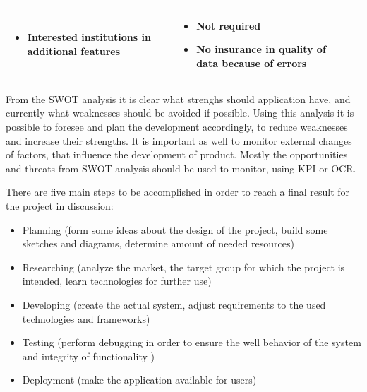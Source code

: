 \documentclass[12pt,a4paper,titlepage]{article}
\begin{document}
\begin{table}[h]
\begin{threeparttable}
\begin{tabular}{ | l | l | l | }
\begin{minipage}{3in}
\begin{itemize}
                    \item Interested institutions in additional features
                \end{itemize}
            \vspace{.5cm}
            \end{minipage} & 
            \begin{minipage}{3in}
                \vspace{.5cm}
                \begin{itemize}
                    \item Not required
                    \item No insurance in quality of data because of errors
                \end{itemize}
                \vspace{.5cm}
            \end{minipage}\\
        \hline
    \end{tabular}
    \end{threeparttable}
\end{table}

From the SWOT analysis it is clear what strenghs should application have, and currently what weaknesses should be avoided if possible. Using this analysis it is possible to foresee and plan the development accordingly, to reduce weaknesses and increase their strengths. It is important as well to monitor external changes of factors, that influence the development of product. Mostly the opportunities and threats from SWOT analysis should be used to monitor, using KPI or OCR.


There are five main steps to be accomplished in order to reach a final result for the project in discussion:
\begin{itemize}
  \item Planning (form some ideas about the design of the project, build some sketches and diagrams, determine amount of needed resources)
  \item Researching (analyze the market, the target group for which the project is intended, learn technologies for further use)
  \item Developing (create the actual system, adjust requirements to the used technologies and frameworks)
  \item Testing (perform debugging in order to ensure the well behavior of the system and integrity of functionality )
  \item Deployment (make the application available for users)
\end{itemize}
\end{document}
